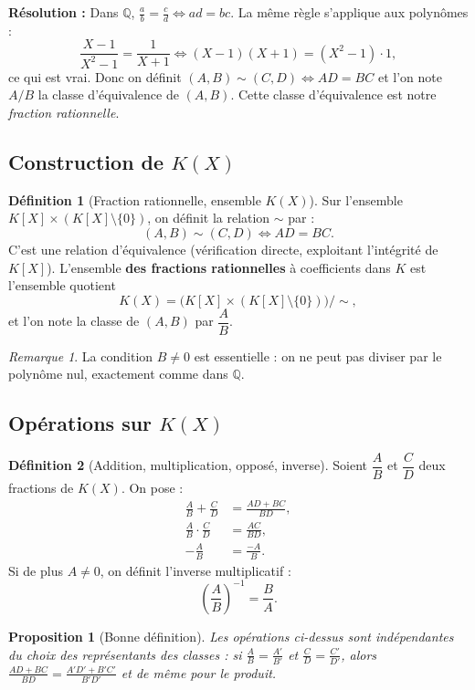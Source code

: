 \documentclass[12pt,a4paper]{report}
\newtheorem{proposition}[theoreme]{Proposition}
\theoremstyle{definition}
\newtheorem{definition}{Définition}[section]
\theoremstyle{remark}
\newtheorem{remarque}{Remarque}[section]
\begin{document}
\textbf{Résolution :} Dans $\mathbb{Q}$, $\frac{a}{b} = \frac{c}{d} \iff ad = bc$. La même règle s'applique aux polynômes :
\[ \frac{X - 1}{X^2 - 1} = \frac{1}{X + 1} \iff (X - 1)(X + 1) = (X^2 - 1) \cdot 1, \]
ce qui est vrai. Donc on définit $(A, B) \sim (C, D) \iff AD = BC$ et l'on note $A/B$ la classe d'équivalence de $(A, B)$. Cette classe d'équivalence est notre \emph{fraction rationnelle}.

\subsection{Construction de $K(X)$}

\begin{definition}[Fraction rationnelle, ensemble $K(X)$]
Sur l'ensemble $K[X] \times (K[X] \setminus \{0\})$, on définit la relation $\sim$ par :
\[ (A, B) \sim (C, D) \iff AD = BC. \]
C'est une relation d'équivalence (vérification directe, exploitant l'intégrité de $K[X]$).
L'ensemble \textbf{des fractions rationnelles} à coefficients dans $K$ est l'ensemble quotient
\[ K(X) = \big( K[X] \times (K[X] \setminus \{0\}) \big) \big/ \sim, \]
et l'on note la classe de $(A, B)$ par $\dfrac{A}{B}$.
\end{definition}

\begin{remarque}
La condition $B \neq 0$ est essentielle : on ne peut pas diviser par le polynôme nul, exactement comme dans $\mathbb{Q}$.
\end{remarque}

\subsection{Opérations sur $K(X)$}

\begin{definition}[Addition, multiplication, opposé, inverse]
Soient $\dfrac{A}{B}$ et $\dfrac{C}{D}$ deux fractions de $K(X)$. On pose :
\begin{align*}
\frac{A}{B} + \frac{C}{D} &= \frac{AD + BC}{BD}, \\
\frac{A}{B} \cdot \frac{C}{D} &= \frac{AC}{BD}, \\
-\frac{A}{B} &= \frac{-A}{B}.
\end{align*}
Si de plus $A \neq 0$, on définit l'inverse multiplicatif :
\[ \left(\frac{A}{B}\right)^{-1} = \frac{B}{A}. \]
\end{definition}

\begin{proposition}[Bonne définition]
Les opérations ci-dessus sont indépendantes du choix des représentants des classes : si $\frac{A}{B} = \frac{A'}{B'}$ et $\frac{C}{D} = \frac{C'}{D'}$, alors $\frac{AD + BC}{BD} = \frac{A'D' + B'C'}{B'D'}$ et de même pour le produit.
\end{proposition}
\end{document}
